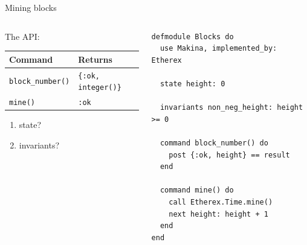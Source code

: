 \documentclass[aspectratio=169, 10pt]{beamer}
\begin{document}
\begin{frame}[label={sec:org4f7f829},fragile]{Mining blocks}
 \begin{columns}
\begin{column}{0.48\columnwidth}
The API:

\begin{center}
\begin{tabular}{ll}
Command & Returns\\
\hline
\texttt{block\_number()} & \texttt{\{:ok, integer()\}}\\
\texttt{mine()} & \texttt{:ok}\\
\end{tabular}
\end{center}

\vspace{0.5cm}

\begin{enumerate}
\item state?
\item invariants?
\end{enumerate}
\end{column}

\begin{column}{0.48\columnwidth}
\lstset{language=elixir,label= ,caption= ,captionpos=b,numbers=none,style=display}
\begin{lstlisting}
defmodule Blocks do
  use Makina, implemented_by: Etherex

  state height: 0

  invariants non_neg_height: height >= 0

  command block_number() do
    post {:ok, height} == result
  end

  command mine() do
    call Etherex.Time.mine()
    next height: height + 1
  end
end
\end{lstlisting}
\end{column}
\end{columns}
\end{frame}
\end{document}
